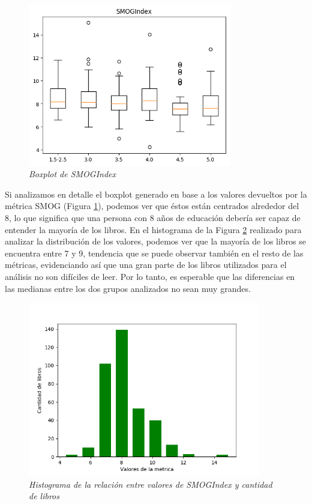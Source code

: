\documentclass[12pt,journal,compsoc]{IEEEtran}
\begin{document}
\begin{figure}[H]
\begin{center}
  \includegraphics[width=3.5in]{../unigrams/scripts/boxplots/not-normalized-SMOGIndex.png}
  \caption{\small \textit{Boxplot de SMOGIndex}}
  \label{fig:boxplotSMOG}
  \end{center}
\end{figure}

Si analizamos en detalle el boxplot generado en base a los valores devueltos por la métrica SMOG (Figura \ref{fig:boxplotSMOG}), podemos ver que éstos están centrados alrededor del 8, lo que significa que una persona con 8 años de educación debería ser capaz de entender la mayoría de los libros. En el histograma de la Figura \ref{fig:histoSMOG} realizado para analizar la distribución de los valores, podemos ver que la mayoría de los libros se encuentra entre 7 y 9, tendencia que se puede observar también en el resto de las métricas, evidenciando así que una gran parte de los libros utilizados para el análisis no son difíciles de leer. Por lo tanto, es esperable que las diferencias en las medianas entre los dos grupos analizados no sean muy grandes.

\begin{figure}[H]
\begin{center}
  \includegraphics[width=4.0in]{../unigrams/scripts/histogram/08-SMOGIndexhistogram.png}
  \caption{\small \textit{Histograma de la relación entre valores de SMOGIndex y cantidad de libros}}
  \label{fig:histoSMOG}
  \end{center}
\end{figure}
\end{document}
